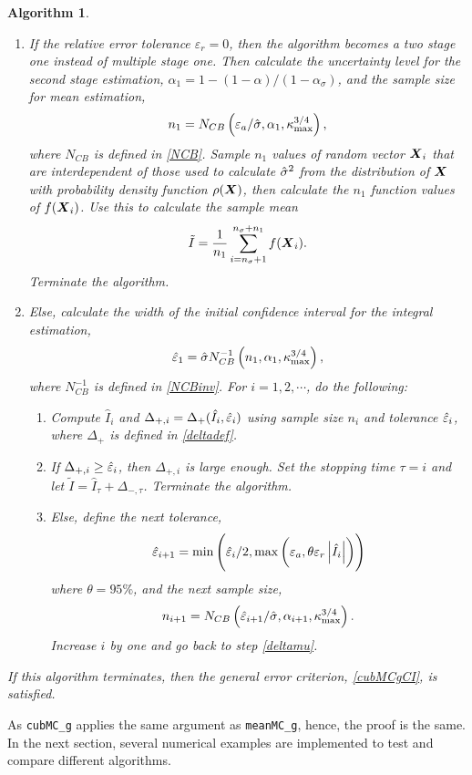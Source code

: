 \documentclass{iitthesis}
\newtheorem{algorithm}[theorem]{Algorithm}
\begin{document}
\begin{algorithm}
\begin{enumerate}
\item If the relative error tolerance $\varepsilon_r=0$, then the algorithm becomes a two stage one instead of multiple stage one. Then calculate the uncertainty level for the second stage estimation, $\alpha_1 = 1-(1-\alpha)/(1-\alpha_\sigma)$, and the sample size for mean estimation, $$n_1 = N_{CB}\left(\varepsilon_a/\hat{\sigma},\alpha_1,\kappa_{\max}^{3/4}\right),$$where $N_{CB}$ is defined in \eqref{NCB}. Sample $n_1$ values of random vector $\boldsymbol{X}_i$ that are interdependent of those used to calculate $\hat{\sigma}^2$ from the distribution of $\boldsymbol{X}$ with probability density function $\rho(\boldsymbol{X})$, then calculate the $n_1$ function values of $f(\boldsymbol{X}_i)$. Use this to calculate the sample mean 
\begin{align}\label{hatIcubMCg}
\tilde{I}= \frac{1}{n_1}\sum_{i = n_\sigma+1}^{n_\sigma+n_1}f(\boldsymbol{X}_i).
\end{align}
Terminate the algorithm.
\item Else, calculate the width of the initial confidence interval for the integral estimation,
\begin{align}
\hat{\varepsilon}_1=\hat{\sigma} N_{CB}^{-1}\left(n_1,\alpha_1,\kappa_{\max}^{3/4}\right),
\end{align}
where $N_{CB}^{-1}$ is defined in \eqref{NCBinv}. For $i = 1,2,\cdots$, do the following:
\begin{enumerate}
\item  \label{deltamucubMCg}Compute $\hat{I}_i$ and $\Delta_{+,i}=\Delta_{+}(\hat{I}_i,\hat{\varepsilon}_i)$ using sample size $n_i$ and tolerance $\hat{\varepsilon}_i$, where $\Delta_{+}$ is defined in \eqref{deltadef}.
\item If $\Delta_{+,i} \geq  \hat{\varepsilon}_i$, then $\Delta_{+,i}$ is large enough. Set the stopping time $\tau = i$ and let $\tilde{I} = \hat{I}_{\tau}+\Delta_{-, \tau}$. Terminate the algorithm.
\item Else, define the next tolerance, $$\hat{\varepsilon}_{i+1} = \min\left(\hat{\varepsilon}_i/2, \max\left(\varepsilon_a,\theta\varepsilon_r\left \lvert \hat{I}_i \right \rvert\right)\right)$$ where $\theta=95\%$, and the next sample size, $$n_{i+1} = N_{CB}\left(\hat{\varepsilon}_{i+1}/\hat{\sigma},\alpha_{i+1},\kappa_{\max}^{3/4}\right).$$ Increase $i$ by one and go back to step \ref{deltamu}. 
\end{enumerate}
\end{enumerate}
If this algorithm terminates, then the general error criterion, \eqref{cubMCgCI}, is satisfied.
\end{algorithm}
As {\tt cubMC\_g} applies the same argument as {\tt meanMC\_g}, hence, the proof is the same. In the next section, several numerical examples are implemented to test and compare different algorithms.
\end{document}
